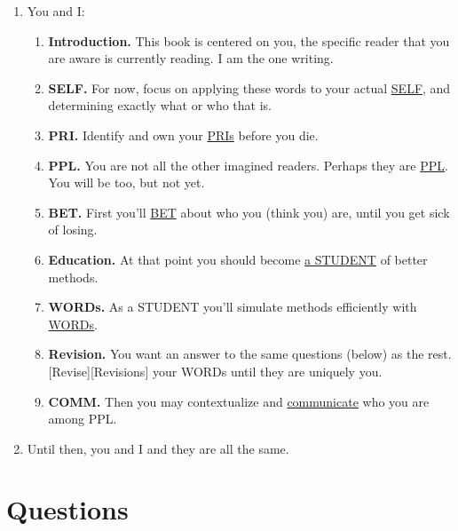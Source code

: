 \documentclass[
]{book}
\providecommand{\tightlist}{%
  \setlength{\itemsep}{0pt}\setlength{\parskip}{0pt}}
\begin{document}
\begin{enumerate}
\def\labelenumi{\arabic{enumi}.}
\tightlist
\item
  You and I:

  \begin{enumerate}
  \def\labelenumii{\arabic{enumii}.}
  \setcounter{enumii}{-1}
  \tightlist
  \item
    \textbf{Introduction.} This book is centered on you, the specific reader that you are aware is currently reading. I am the one writing.
  \item
    \textbf{SELF.} For now, focus on applying these words to your actual \protect\hyperlink{self-1}{SELF}, and determining exactly what or who that is.
  \item
    \textbf{PRI.} Identify and own your \protect\hyperlink{priorities}{PRIs} before you die.
  \item
    \textbf{PPL.} You are not all the other imagined readers. Perhaps they are \protect\hyperlink{ppl}{PPL}. You will be too, but not yet.
  \item
    \textbf{BET.} First you'll \protect\hyperlink{bet-2}{BET} about who you (think you) are, until you get sick of losing.
  \item
    \textbf{Education.} At that point you should become \protect\hyperlink{education}{a STUDENT} of better methods.
  \item
    \textbf{WORDs.} As a STUDENT you'll simulate methods efficiently with \protect\hyperlink{words}{WORDs}.
  \item
    \textbf{Revision.} You want an answer to the same questions (below) as the rest. {[}Revise{]}{[}Revisions{]} your WORDs until they are uniquely you.
  \item
    \textbf{COMM.} Then you may contextualize and \protect\hyperlink{communication}{communicate} who you are among PPL.
  \end{enumerate}
\item
  Until then, you and I and they are all the same.
\end{enumerate}

\hypertarget{questions}{%
\section{Questions}\label{questions}}
\end{document}
